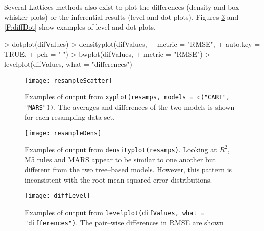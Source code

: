 \documentclass[12pt]{article}
\begin{document}
Several Lattices methods also exist to plot the differences (density
and box--whisker plots) or the inferential results (level and dot
plots). Figures \ref{F:diffLevel} and \ref{F:diffDot} show examples of
level and dot plots.

\begin{Schunk}
\begin{Sinput}
> dotplot(difValues)
> densityplot(difValues,
+             metric = "RMSE",
+             auto.key = TRUE,
+             pch = "|")
> bwplot(difValues,
+        metric = "RMSE")
> levelplot(difValues, what = "differences")
\end{Sinput}
\end{Schunk}



\begin{figure}
   \begin{center}		
      \texttt{[image: resampleScatter]}    

      \caption{ Examples of output from \texttt{xyplot(resamps, models = c("CART", "MARS"))}. The averages and differences of the two models is shown for each resampling data set.}
      \label{f:resampleScatter} 
    \end{center}
\end{figure} 

\begin{figure}
   \begin{center}		
      \texttt{[image: resampleDens]}    

      \caption{ Examples of output from
        \texttt{densityplot(resamps)}. Looking at $R^2$, M5 rules and MARS appear to be
        similar to one another but different from the two tree--based
        models. However, this pattern is inconsistent with the root
        mean squared error distributions.}
      \label{F:resampleDens} 
    \end{center}
\end{figure} 


\begin{figure}
   \begin{center}		
      \texttt{[image: diffLevel]}    

      \caption{ Examples of output from \texttt{levelplot(difValues,
          what = "differences")}. The pair--wise differences in RMSE
        are shown}
      \label{F:diffLevel} 
    \end{center}
\end{figure} 
\end{document}
